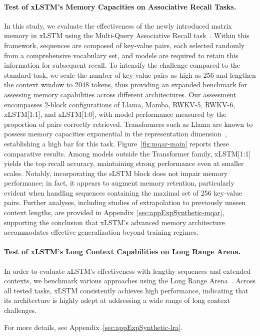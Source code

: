 \paragraph{Test of xLSTM's Memory Capacities on Associative Recall Tasks.} In this study, we evaluate the effectiveness of the newly introduced matrix memory in xLSTM using the Multi-Query Associative Recall task~\citep{Arora:23arxiv}. Within this framework, sequences are composed of key-value pairs, each selected randomly from a comprehensive vocabulary set, and models are required to retain this information for subsequent recall. To intensify the challenge compared to the standard task, we scale the number of key-value pairs as high as 256 and lengthen the context window to 2048 tokens, thus providing an expanded benchmark for assessing memory capabilities across different architectures. Our assessment encompasses 2-block configurations of Llama, Mamba, RWKV-5, RWKV-6, xLSTM[1:1], and xLSTM[1:0], with model performance measured by the proportion of pairs correctly retrieved. Transformers such as Llama are known to possess memory capacities exponential in the representation dimension~\citep{Ramsauer:21}, establishing a high bar for this task. Figure~\ref{fig:mqar-main} reports these comparative results. Among models outside the Transformer family, xLSTM[1:1] yields the top recall accuracy, maintaining strong performance even at smaller scales. Notably, incorporating the sLSTM block does not impair memory performance; in fact, it appears to augment memory retention, particularly evident when handling sequences containing the maximal set of 256 key-value pairs. Further analyses, including studies of extrapolation to previously unseen context lengths, are provided in Appendix~\ref{sec:appExpSynthetic-mqar}, supporting the conclusion that xLSTM's advanced memory architecture accommodates effective generalization beyond training regimes.

\paragraph{Test of xLSTM's Long Context Capabilities on Long Range Arena.} In order to evaluate xLSTM's effectiveness with lengthy sequences and extended contexts, we benchmark various approaches using the Long Range Arena~\citep{Tay:21}. Across all tested tasks, xLSTM consistently achieves high performance, indicating that its architecture is highly adept at addressing a wide range of long context challenges.

For more details, see Appendix~\ref{sec:appExpSynthetic-lra}.

